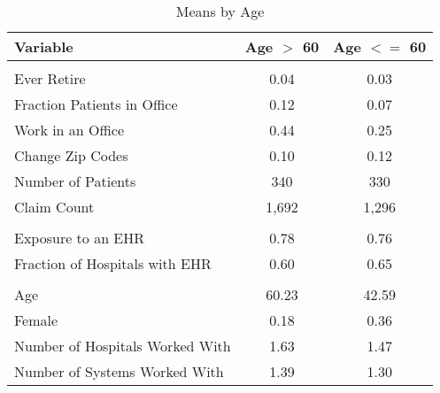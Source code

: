 \begin{table}[ht]

\caption{Means by Age}
\centering
\begin{tabular}[t]{lcc}
\toprule
Variable & Age $>$ 60 & Age $<=$ 60\\
\midrule
\addlinespace[0.3em]
\multicolumn{3}{l}{\textbf{Outcomes}}\\
\hspace{1em}Ever Retire & 0.04 & 0.03\\
\hspace{1em}Fraction Patients in Office & 0.12 & 0.07\\
\hspace{1em}Work in an Office & 0.44 & 0.25\\
\hspace{1em}Change Zip Codes & 0.10 & 0.12\\
\hspace{1em}Number of Patients & 340 & 330\\
\hspace{1em}Claim Count & 1,692 & 1,296\\
\addlinespace[0.3em]
\multicolumn{3}{l}{\textbf{Treatment}}\\
\hspace{1em}Exposure to an EHR & 0.78 & 0.76\\
\hspace{1em}Fraction of Hospitals with EHR & 0.60 & 0.65\\
\addlinespace[0.3em]
\multicolumn{3}{l}{\textbf{Characteristics}}\\
\hspace{1em}Age & 60.23 & 42.59\\
\hspace{1em}Female & 0.18 & 0.36\\
\hspace{1em}Number of Hospitals Worked With & 1.63 & 1.47\\
\hspace{1em}Number of Systems Worked With & 1.39 & 1.30\\
\bottomrule
\end{tabular}
\end{table}
\label{tab:splitstats}